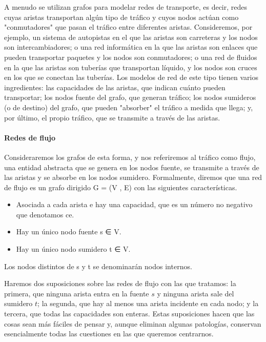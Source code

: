 \documentclass[a4paper, 12pt]{book}
\theoremstyle{dotless}
\begin{document}
A menudo se utilizan grafos para modelar redes de transporte, es decir, redes cuyas aristas transportan algún tipo de tráfico y cuyos nodos actúan como "conmutadores" que pasan el tráfico entre diferentes aristas. Consideremos, por ejemplo, un sistema de autopistas en el que las aristas son carreteras y los nodos son intercambiadores; o una red informática en la que las aristas son enlaces que pueden transportar paquetes y los nodos son conmutadores; o una red de fluidos en la que las aristas son tuberías que transportan líquido, y los nodos son cruces en los que se conectan las tuberías. Los modelos de red de este tipo tienen varios ingredientes: las capacidades de las aristas, que indican cuánto pueden transportar; los nodos fuente del grafo, que generan tráfico; los nodos sumideros (o de destino) del grafo, que pueden "absorber" el tráfico a medida que llega; y, por último, el propio tráfico, que se transmite a través de las aristas.

\paragraph{Redes de flujo} Consideraremos los grafos de esta forma, y nos referiremos al tráfico como flujo, una entidad abstracta que se genera en los nodos fuente, se transmite a través de las aristas y se absorbe en los nodos sumidero. Formalmente, diremos que una red de flujo es un grafo dirigido G = (V , E) con las siguientes características.

\begin{itemize}
    \item Asociada a cada arista e hay una capacidad, que es un número no negativo que denotamos ce.
    \item Hay un único nodo fuente s ∈ V.
    \item Hay un único nodo sumidero t ∈ V.
\end{itemize}

Los nodos distintos de s y t se denominarán nodos internos.

Haremos dos suposiciones sobre las redes de flujo con las que tratamos: la primera, que ninguna arista entra en la fuente $s$ y ninguna arista sale del sumidero $t$; la segunda, que hay al menos una arista incidente en cada nodo; y la tercera, que todas las capacidades son enteras. Estas suposiciones hacen que las cosas sean más fáciles de pensar y, aunque eliminan algunas patologías, conservan esencialmente todas las cuestiones en las que queremos centrarnos.
\end{document}
